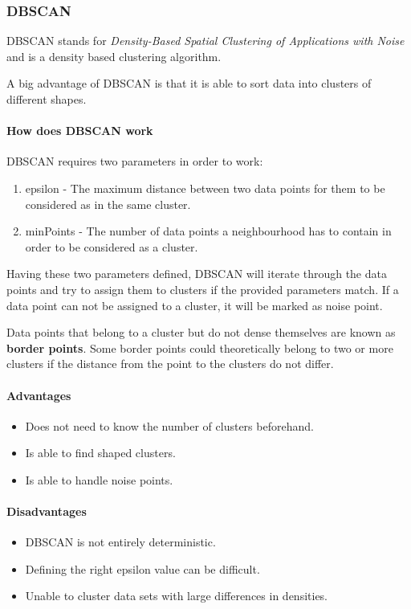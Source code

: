 \subsubsection{DBSCAN}
DBSCAN stands for \textit{Density-Based Spatial Clustering of Applications with Noise}
and is a density based clustering algorithm.

A big advantage of DBSCAN is that it is able to sort data into clusters
of different shapes.

\paragraph{How does DBSCAN work}
DBSCAN requires two parameters in order to work:

\begin{enumerate}
    \item epsilon - The maximum distance between two data points for them to be considered as in the same cluster.
    \item minPoints - The number of data points a neighbourhood has to contain in order to be considered as a cluster.
\end{enumerate}

Having these two parameters defined, DBSCAN will iterate through the data points
and try to assign them to clusters if the provided parameters match.
If a data point can not be assigned to a cluster, it will be marked as noise point.

Data points that belong to a cluster but do not dense themselves are known as \textbf{border points}.
Some border points could theoretically belong to two or more clusters
if the distance from the point to the clusters do not differ.

\paragraph{Advantages}
\begin{itemize}
    \item Does not need to know the number of clusters beforehand.
    \item Is able to find shaped clusters.
    \item Is able to handle noise points.
\end{itemize}

\paragraph{Disadvantages}
\begin{itemize}
    \item DBSCAN is not entirely deterministic.
    \item Defining the right epsilon value can be difficult.
    \item Unable to cluster data sets with large differences in densities.
\end{itemize}

